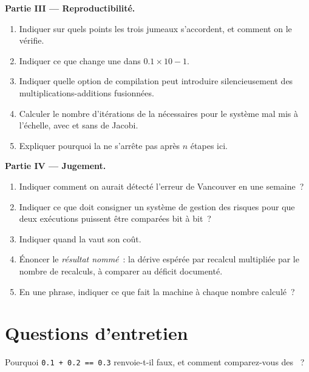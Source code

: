 \begin{problem}
\medskip\noindent\textbf{Partie III --- Reproductibilité.}
\begin{enumerate}[resume]
\item Indiquer sur quels points les trois jumeaux s'accordent, et comment on le vérifie.
\item Indiquer ce que change une  dans $0.1 \times 10 - 1$.
\item Indiquer quelle option de compilation peut introduire silencieusement des multiplications-additions fusionnées.
\item Calculer le nombre d'itérations de la  nécessaires pour le système mal mis à l'échelle, avec et sans  de Jacobi.
\item Expliquer pourquoi la  ne s'arrête pas après $n$ étapes ici.
\end{enumerate}

\medskip\noindent\textbf{Partie IV --- Jugement.}
\begin{enumerate}[resume]
\item Indiquer comment on aurait détecté l'erreur de Vancouver en une semaine~?
\item Indiquer ce que doit consigner un système de gestion des risques pour que deux exécutions puissent être comparées bit à bit~?
\item Indiquer quand la  vaut son coût.
\item Énoncer le \emph{résultat nommé}~: la dérive espérée par recalcul multipliée par le nombre de recalculs, à comparer au déficit documenté.
\item En une phrase, indiquer ce que fait la machine à chaque nombre calculé~?
\end{enumerate}
\end{problem}

\section{Questions d'entretien}

\begin{interviewq}\label{iq:qm:floating-point-and-numerical-linear-algebra:1}
Pourquoi \texttt{0.1 + 0.2 == 0.3} renvoie-t-il faux, et comment comparez-vous des ~?
\end{interviewq}

